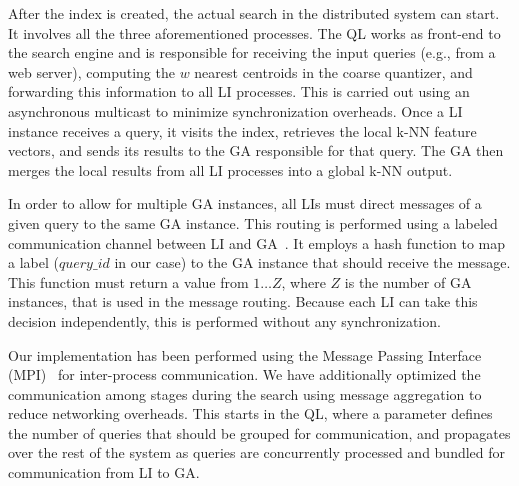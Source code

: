 After the index is created, the actual search in the distributed system can start. It
involves all the three aforementioned processes. The QL works as front-end 
to the search engine and is responsible for receiving the input 
queries (e.g., from a web server), computing the $w$ nearest centroids in the coarse quantizer, and 
forwarding this information to all LI processes. This is carried out using an asynchronous 
multicast to minimize synchronization overheads. Once a LI instance
receives a query, it visits the index, retrieves the local k-NN feature vectors, and sends its 
results to the GA responsible for that query. The GA then merges the local results from all LI 
processes into a global k-NN output.

In order to allow for multiple GA instances, all LIs must direct 
messages of a given query to the same GA instance. This routing is performed using a labeled 
communication channel between LI and GA~\cite{4625861}. It employs
a hash function to map a label ($query\_id$ in our case) to the GA instance that should receive
the message. This function must return a value from $1\ldots Z$, where $Z$ is the number of
GA instances, that is used in the message routing. Because each LI can take this decision 
independently, this is performed without any synchronization.

Our implementation has been performed using the Message Passing Interface (MPI)~\cite{mpi} 
for inter-process communication. We have additionally optimized the communication 
among stages during the search using message aggregation to reduce networking 
overheads. This starts in the QL, where a parameter defines the number of queries 
that should be grouped for communication, and propagates over the rest of the system as queries are concurrently processed and bundled for communication from LI to GA. 
